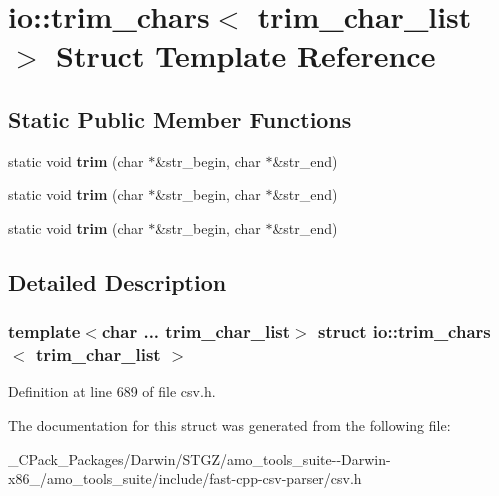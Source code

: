 \hypertarget{structio_1_1trim__chars}{}\section{io\+:\+:trim\+\_\+chars$<$ trim\+\_\+char\+\_\+list $>$ Struct Template Reference}
\label{structio_1_1trim__chars}
\subsection*{Static Public Member Functions}
\begin{DoxyCompactItemize}
\item 
\mbox{\label{structio_1_1trim__chars_a4cffc5e839ab4024ca8c8330e26e338c}} 
static void {\bfseries trim} (char $\ast$\&str\+\_\+begin, char $\ast$\&str\+\_\+end)
\item 
\mbox{\label{structio_1_1trim__chars_a4cffc5e839ab4024ca8c8330e26e338c}} 
static void {\bfseries trim} (char $\ast$\&str\+\_\+begin, char $\ast$\&str\+\_\+end)
\item 
\mbox{\label{structio_1_1trim__chars_a4cffc5e839ab4024ca8c8330e26e338c}} 
static void {\bfseries trim} (char $\ast$\&str\+\_\+begin, char $\ast$\&str\+\_\+end)
\end{DoxyCompactItemize}


\subsection{Detailed Description}
\subsubsection*{template$<$char ... trim\+\_\+char\+\_\+list$>$\newline
struct io\+::trim\+\_\+chars$<$ trim\+\_\+char\+\_\+list $>$}



Definition at line 689 of file csv.\+h.



The documentation for this struct was generated from the following file\+:\begin{DoxyCompactItemize}
\item 
\+\_\+\+C\+Pack\+\_\+\+Packages/\+Darwin/\+S\+T\+G\+Z/amo\+\_\+tools\+\_\+suite-\/-\/\+Darwin-\/x86\+\_/amo\+\_\+tools\+\_\+suite/include/fast-\/cpp-\/csv-\/parser/csv.\+h\end{DoxyCompactItemize}
